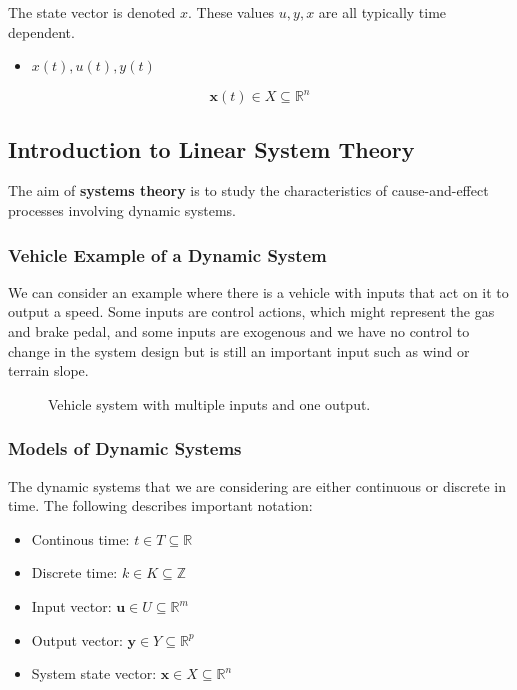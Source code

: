 \documentclass[11pt]{article}
\begin{document}
The state vector is denoted $x$.
These values $u,y,x$ are all typically time dependent.
\begin{itemize}
  \item $x(t), u(t), y(t)$
\end{itemize}

\begin{equation}
  \textbf{x}(t) \in X \subseteq \mathbb{R}^n
\end{equation}

\subsection{Introduction to Linear System Theory}
The aim of \textbf{systems theory} is to study the characteristics of cause-and-effect processes involving dynamic systems.
\subsubsection{Vehicle Example of a Dynamic System}
We can consider an example where there is a vehicle with inputs that act on it to output a speed.
Some inputs are control actions, which might represent the gas and brake pedal, and some inputs are exogenous and we have no control to change in the system design but is still an important input such as wind or terrain slope.

\begin{figure}[h]
  \centering
  \caption{Vehicle system with multiple inputs and one output.}
  \label{figure:vehicle_system}
\end{figure}

\subsubsection{Models of Dynamic Systems}

The dynamic systems that we are considering are either continuous or discrete in time.
The following describes important notation:
\begin{itemize}
  \item Continous time: $t \in T \subseteq \mathbb{R}$
  \item Discrete time: $ k \in K \subseteq \mathbb{Z}$
  \item Input vector: $ \textbf{u} \in U \subseteq \mathbb{R}^m$
  \item Output vector: $\textbf{y} \in Y \subseteq \mathbb{R}^p$
  \item System state vector: $\textbf{x} \in X \subseteq \mathbb{R}^n$
\end{itemize}
\end{document}
